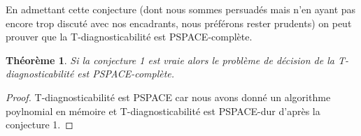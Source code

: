 \documentclass[conference]{IEEEtran}
\newtheorem{myth}{Th\'eor\`eme}
\begin{document}
En admettant cette conjecture (dont nous sommes persuadés mais n'en ayant pas encore trop discuté avec nos encadrants, nous préférons rester prudents) on peut prouver que la T-diagnosticabilité est PSPACE-complète.
\begin{myth}
Si la conjecture 1 est vraie alors le problème de décision de la T-diagnosticabilité est PSPACE-complète.
\end{myth}
\begin{proof}
T-diagnosticabilité est PSPACE car nous avons donné un algorithme poylnomial en mémoire et T-diagnosticabilité est PSPACE-dur d'après la conjecture 1.
\end{proof}



%
%



%
%
\end{document}
